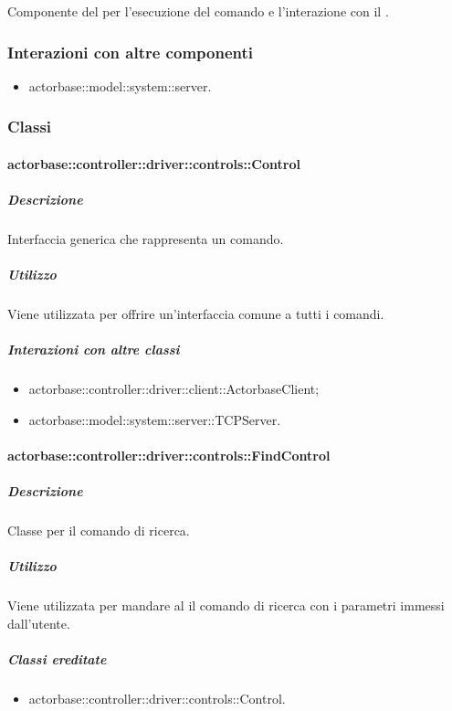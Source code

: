\documentclass{scalatekids-article}
\begin{document}
Componente del  per l'esecuzione del comando e l'interazione
con il .

\subsubsection{Interazioni con altre componenti}

\begin{itemize}
\item actorbase::model::system::server.
\end{itemize}

\subsubsection{Classi}

\paragraph{actorbase::controller::driver::controls::Control}

\subparagraph{Descrizione}

Interfaccia generica che rappresenta un comando.

\subparagraph{Utilizzo}

Viene utilizzata per offrire un'interfaccia comune a tutti i comandi.

\subparagraph{Interazioni con altre classi}

\begin{itemize}
\item actorbase::controller::driver::client::ActorbaseClient;
\item actorbase::model::system::server::TCPServer.
\end{itemize}

\paragraph{actorbase::controller::driver::controls::FindControl}

\subparagraph{Descrizione}

Classe per il comando di ricerca.

\subparagraph{Utilizzo}

Viene utilizzata per mandare al  il comando di ricerca con i
parametri immessi dall'utente.

\subparagraph{Classi ereditate}

\begin{itemize}
\item actorbase::controller::driver::controls::Control.
\end{itemize}
\end{document}
